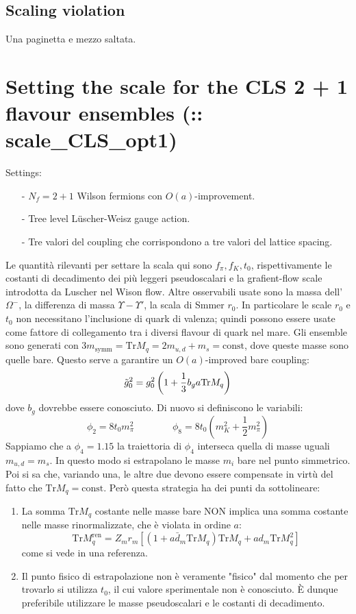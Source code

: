 \documentclass[12pt,a4paper,openright]{article}
\newcommand{\ren}{{\text{ren}}}
\begin{document}
\subsection{Scaling violation}
Una paginetta e mezzo saltata.

\newpage
\section{Setting the scale for the CLS 2 + 1 flavour ensembles (:: scale\_CLS\_opt1)}
Settings:
\begin{itemize}
  \item [-] $N_f = 2+1$ Wilson fermions con $O(a)$-improvement.
  \item [-] Tree level Lüscher-Weisz gauge action.
  \item [-] Tre valori del coupling che corrispondono a tre valori del lattice spacing.
\end{itemize}
Le quantità rilevanti per settare la scala qui sono $f_\pi, f_K, t_0$, rispettivamente le costanti di decadimento dei più leggeri pseudoscalari e la grafient-flow scale introdotta da Luscher nel Wison flow.
Altre osservabili usate sono la massa dell'$\Omega^-$, la differenza di massa $\Upsilon-\Upsilon'$, la scala di Smmer $r_0$.
In particolare le scale $r_0$ e $t_0$ non necessitano l'inclusione di quark di valenza;
quindi possono essere usate come fattore di collegamento tra i diversi flavour di quark nel mare.
\newline
Gli ensemble sono generati con $3m_{\text{symm}} = \text{Tr} M_q = 2 m_{u,d} + m_s = \text{const}$, dove queste masse sono quelle bare.
Questo serve a garantire un $O(a)$-improved bare coupling:
\begin{equation*}
  \tilde{g}_0^2 = g_0^2 \left( 1+ \frac{1}{3} \space b_g \space a \space \text{Tr}M_q \right)
\end{equation*}
dove $b_g$ dovrebbe essere conosciuto.
Di nuovo si definiscono le variabili:
\begin{equation*}
  \phi_2 = 8t_0 m_\pi^2 \qquad \qquad \phi_8 = 8t_0 \left(m_K^2 + \frac{1}{2}m_\pi^2\right)
\end{equation*}
Sappiamo che a $\phi_4 = 1.15$ la traiettoria di $\phi_4$ interseca quella di masse uguali $m_{u,d} = m_s$. In questo modo si estrapolano le masse $m_i$ bare nel punto simmetrico.
Poi si sa che, variando una, le altre due devono essere compensate in virtù del fatto che $\text{Tr}M_q = \text{const}$.
Però questa strategia ha dei punti da sottolineare:
\begin{enumerate}
  \item La somma $\text{Tr} M_q$ costante nelle masse bare NON implica una somma costante nelle masse rinormalizzate, che è violata in ordine $a$: $$\text{Tr}M_q^\ren = Z_m r_m \left[\left(1 + a \bar d_m \text{Tr}M_q\right)\text{Tr}M_q + a d_m \text{Tr}M_q^2\right]$$ come si vede in una referenza.
  \item Il punto fisico di estrapolazione non è veramente "fisico" dal momento che per trovarlo si utilizza $t_0$, il cui valore sperimentale non è conosciuto. È dunque preferibile utilizzare le masse pseudoscalari e le costanti di decadimento.
\end{enumerate}
\end{document}
